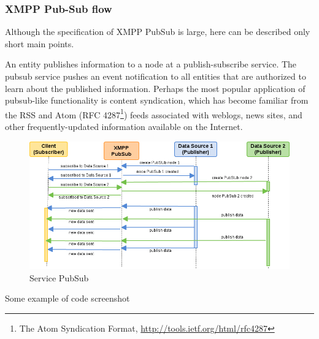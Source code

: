    \subsubsection{XMPP Pub-Sub flow}
	Although the specification of XMPP PubSub is large, here can be described only short main points.

	An entity publishes information to a node at a publish-subscribe service. The pubsub service pushes an event notification to all entities that are authorized to learn about the published information. Perhaps the most popular application of pubsub-like functionality is content syndication, which has become familiar from the RSS and Atom (RFC 4287\footnote{The Atom Syndication Format, \url{http://tools.ietf.org/html/rfc4287}}) feeds associated with weblogs, news sites, and other frequently-updated information available on the Internet. 
    \begin{figure}[!ht]
    \centering
    \includegraphics[scale=0.6]{images/PubSub.png}   
    \caption[Service PubSub]{Service PubSub}
    \label{img:pub_sub}                           
    \end{figure}

	Some example of code screenshot

